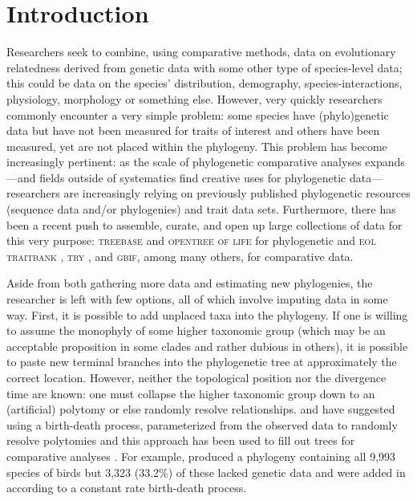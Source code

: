 \documentclass[a4paper,11pt]{article}
\begin{document}
\section{Introduction}
Researchers seek to combine, using comparative methods, data on evolutionary relatedness derived from genetic data with some other type of species-level data; this could be data on the species' distribution, demography, species-interactions, physiology, morphology or something else.    However, very quickly researchers commonly encounter a very simple problem: some species have (phylo)genetic data but have not been measured for traits of interest and others have been measured, yet are not placed within the phylogeny. This problem has become increasingly pertinent: as the scale of phylogenetic comparative analyses expands---and fields outside of systematics find creative uses for phylogenetic data---researchers are increasingly relying on previously published phylogenetic resources (sequence data and/or phylogenies) and trait data sets. Furthermore,  there has been a recent push to assemble, curate, and open up large collections of data for this very purpose: \textsc{treebase} \citep{treebase} and \textsc{opentree of life} \citep{OpenTree} for phylogenetic and \textsc{eol traitbank} \citep{eol}, \textsc{try} \citep{try}, and \textsc{gbif}, among many others, for comparative data. 

Aside from both gathering more data and estimating new phylogenies, the researcher is left with few options, all of which involve imputing data in some way. First, it is possible to add unplaced taxa into the phylogeny. If one is willing to assume the monophyly of some higher taxonomic group (which may be an acceptable proposition in some clades and rather dubious in others), it is possible to paste new terminal branches into the phylogenetic tree at approximately the correct location. However, neither the topological position nor the divergence time are known: one must collapse the higher taxonomic group down to an (artificial) polytomy or else randomly resolve relationships. \citet{Kuhn2011} and \citet{ThomasPastis} have suggested using a birth-death process, parameterized from the observed data to randomly resolve polytomies \citep[see also][for a related approach for fossil trees]{Bapst2013} and this approach has been used to fill out trees for comparative analyses \citep{Jetz2012, Price2012, Rolland2014, Jetz2014}. For example, \citet{Jetz2012} produced a phylogeny containing all 9,993 species of birds but 3,323 (33.2\%) of these lacked genetic data and were added in according to a constant rate birth-death process. 
\end{document}
